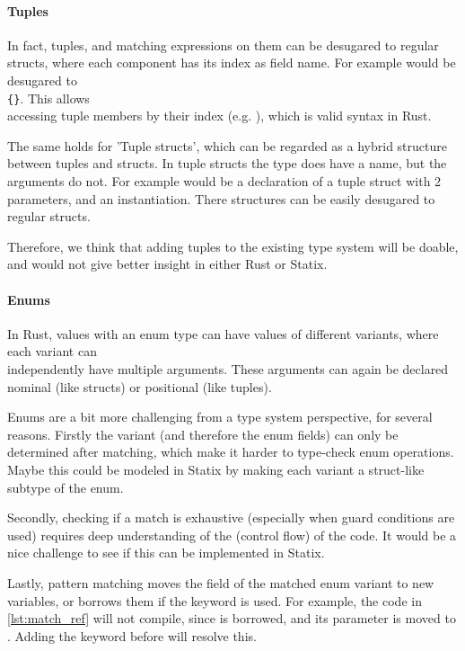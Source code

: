 \paragraph{Tuples}

In fact, tuples, and matching expressions on them can be desugared to regular structs, where each component has its index as field name. For example  would be desugared to\\ \texttt{\{}\texttt{\}}. This allows\\ accessing tuple members by their index (e.g. ), which is valid syntax in Rust.

The same holds for 'Tuple structs', which can be regarded as a hybrid structure between tuples and structs. In tuple structs the type does have a name, but the arguments do not. For example  would be a declaration of a tuple struct with 2  parameters, and  an instantiation. There structures can be easily desugared to regular structs.

Therefore, we think that adding tuples to the existing type system will be doable, and would not give better insight in either Rust or Statix.

\paragraph{Enums}

In Rust, values with an enum type can have values of different variants, where each variant can \\independently have multiple arguments. These arguments can again be declared nominal (like structs) or positional (like tuples). 

Enums are a bit more challenging from a type system perspective, for several reasons. Firstly the variant (and therefore the enum fields) can only be determined after matching, which make it harder to type-check enum operations. Maybe this could be modeled in Statix by making each variant a struct-like subtype of the enum.

Secondly, checking if a match is exhaustive (especially when guard conditions are used) requires deep understanding of the (control flow) of the code. It would be a nice challenge to see if this can be implemented in Statix.

Lastly, pattern matching moves the field of the matched enum variant to new variables, or borrows them if the  keyword is used. For example, the code in \autoref{lst:match_ref} will not compile, since  is borrowed, and its parameter is moved to . Adding the  keyword before  will resolve this.

